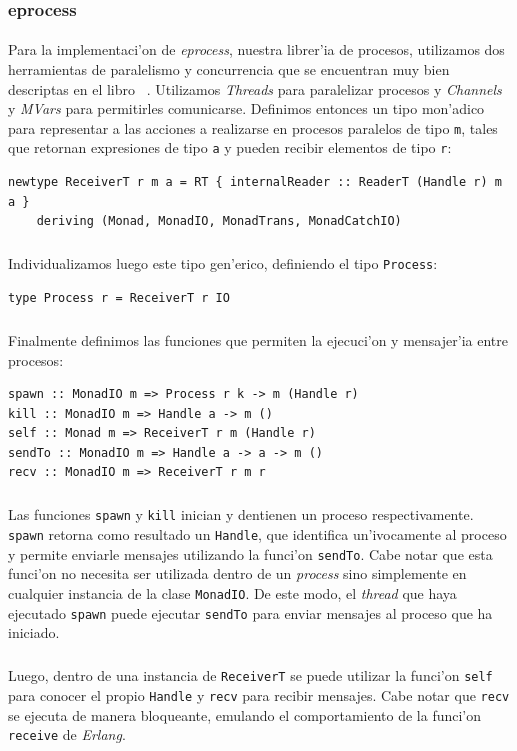 \documentclass[a4paper]{article}
\begin{document}
\subsubsection{eprocess}
\paragraph{}Para la implementaci'on de \textsl{eprocess}, nuestra librer'ia de procesos, utilizamos dos herramientas de paralelismo y concurrencia que se encuentran muy bien descriptas en el libro ~\cite{realworldhaskell}.  Utilizamos \textsl{Threads} para paralelizar procesos y \textsl{Channels} y \textsl{MVars} para permitirles comunicarse.  Definimos entonces un tipo mon'adico para representar a las acciones a realizarse en procesos paralelos de tipo \texttt{m}, tales que retornan expresiones de tipo \texttt{a} y pueden recibir elementos de tipo \texttt{r}:
\begin{center}\begin{lstlisting}
newtype ReceiverT r m a = RT { internalReader :: ReaderT (Handle r) m a }
    deriving (Monad, MonadIO, MonadTrans, MonadCatchIO)
\end{lstlisting}\end{center}
\subparagraph{}Individualizamos luego este tipo gen'erico, definiendo el tipo \texttt{Process}:
\begin{center}\begin{lstlisting}
type Process r = ReceiverT r IO
\end{lstlisting}\end{center}
\subparagraph{}Finalmente definimos las funciones que permiten la ejecuci'on y mensajer'ia entre procesos:
\begin{center}\begin{lstlisting}
spawn :: MonadIO m => Process r k -> m (Handle r)
kill :: MonadIO m => Handle a -> m ()
self :: Monad m => ReceiverT r m (Handle r)
sendTo :: MonadIO m => Handle a -> a -> m ()
recv :: MonadIO m => ReceiverT r m r
\end{lstlisting}\end{center}
\subparagraph{}Las funciones \texttt{spawn} y \texttt{kill} inician y dentienen un proceso respectivamente.  \texttt{spawn} retorna como resultado un \texttt{Handle}, que identifica un'ivocamente al proceso y permite enviarle mensajes utilizando la funci'on \texttt{sendTo}.  Cabe notar que esta funci'on no necesita ser utilizada dentro de un \textsl{process} sino simplemente en cualquier instancia de la clase \texttt{MonadIO}.  De este modo, el \textsl{thread} que haya ejecutado \texttt{spawn} puede ejecutar \texttt{sendTo} para enviar mensajes al proceso que ha iniciado.
\subparagraph{}Luego, dentro de una instancia de \texttt{ReceiverT} se puede utilizar la funci'on \texttt{self} para conocer el propio \texttt{Handle} y \texttt{recv} para recibir mensajes.  Cabe notar que \texttt{recv} se ejecuta de manera bloqueante, emulando el comportamiento de la funci'on \texttt{receive} de \textsl{Erlang}.
\end{document}
